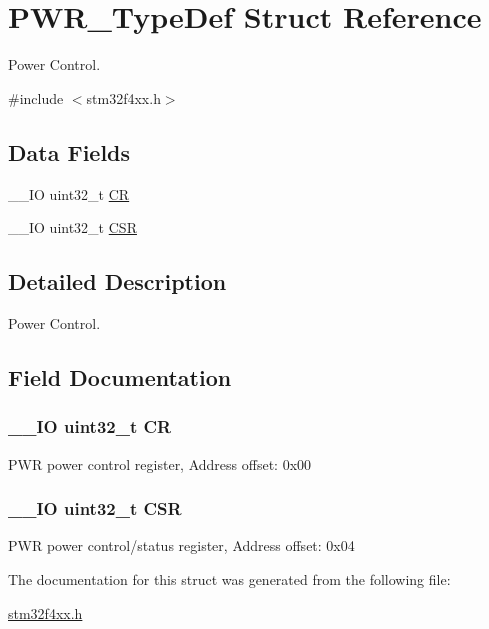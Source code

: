 \hypertarget{struct_p_w_r___type_def}{\section{P\-W\-R\-\_\-\-Type\-Def Struct Reference}
\label{struct_p_w_r___type_def}
}


Power Control.  




{\ttfamily \#include $<$stm32f4xx.\-h$>$}

\subsection*{Data Fields}
\begin{DoxyCompactItemize}
\item 
\-\_\-\-\_\-\-I\-O uint32\-\_\-t \hyperlink{struct_p_w_r___type_def_ab40c89c59391aaa9d9a8ec011dd0907a}{C\-R}
\item 
\-\_\-\-\_\-\-I\-O uint32\-\_\-t \hyperlink{struct_p_w_r___type_def_a876dd0a8546697065f406b7543e27af2}{C\-S\-R}
\end{DoxyCompactItemize}


\subsection{Detailed Description}
Power Control. 

\subsection{Field Documentation}
\hypertarget{struct_p_w_r___type_def_ab40c89c59391aaa9d9a8ec011dd0907a}{
\subsubsection[{C\-R}]{\setlength{\rightskip}{0pt plus 5cm}\-\_\-\-\_\-\-I\-O uint32\-\_\-t C\-R}}\label{struct_p_w_r___type_def_ab40c89c59391aaa9d9a8ec011dd0907a}
P\-W\-R power control register, Address offset\-: 0x00 \hypertarget{struct_p_w_r___type_def_a876dd0a8546697065f406b7543e27af2}{
\subsubsection[{C\-S\-R}]{\setlength{\rightskip}{0pt plus 5cm}\-\_\-\-\_\-\-I\-O uint32\-\_\-t C\-S\-R}}\label{struct_p_w_r___type_def_a876dd0a8546697065f406b7543e27af2}
P\-W\-R power control/status register, Address offset\-: 0x04 

The documentation for this struct was generated from the following file\-:\begin{DoxyCompactItemize}
\item 
\hyperlink{stm32f4xx_8h}{stm32f4xx.\-h}\end{DoxyCompactItemize}
